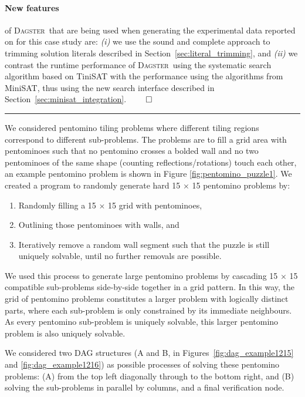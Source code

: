 \documentclass[10pt,a4paper,oneside,headinclude,footinclude,BCOR5mm]{scrartcl}
\newcommand{\dagster}{\textsc{Dagster}\xspace}
\begin{document}
\paragraph{New features} of \dagster\ that are being used when generating the experimental data reported on for this case study are: {\em (i)}  we use the sound and complete approach to trimming solution literals described in Section~\ref{sec:literal_trimming}, and {\em (ii)} we contrast the runtime performance of \dagster\ using the systematic search algorithm based on {\textsc TiniSAT} with the performance using the algorithms from {\textsc MiniSAT}, thus using the new search interface described in Section~\ref{sec:minisat_integration}. $\qed$\\\rule{50pt}{5pt}





%

We considered pentomino tiling problems where different tiling regions correspond to different sub-problems.
The problems are to fill a grid area with pentominoes such that no pentomino crosses a bolded wall and no two pentominoes of the same shape (counting reflections/rotations) touch each other, an example pentomino problem is shown in Figure \ref{fig:pentomino_puzzle1}. We created a program to randomly generate hard 15 $\times$ 15 pentomino problems by:
\begin{enumerate}
\item Randomly filling a 15 $\times$ 15 grid with pentominoes, 
\item Outlining those pentominoes with walls, and
\item Iteratively remove a random wall segment such that the puzzle is still uniquely solvable, until no further removals are possible.
\end{enumerate}

We used this process to generate large pentomino problems by cascading 15 $\times$ 15 compatible sub-problems side-by-side together in a grid pattern.
In this way, the grid of pentomino problems constitutes a larger problem with logically distinct parts, where each sub-problem is only constrained by its immediate neighbours. As every pentomino sub-problem is uniquely solvable, this larger pentomino problem is also uniquely solvable.

We considered two DAG structures (A and B, in Figures~\ref{fig:dag_example1215} and \ref{fig:dag_example1216}) as possible processes of solving these pentomino problems: (A) from the top left diagonally through to the bottom right, and (B) solving the sub-problems in parallel by columns, and a final verification node.
\end{document}
